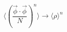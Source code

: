 \begin{equation}
\langle ( \frac {\vec \phi \cdot \vec \phi}{N})^n \rangle \rightarrow
\langle
\rho \rangle^n \end{equation}

